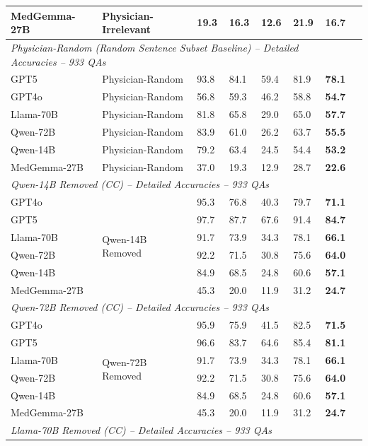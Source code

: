 \documentclass[11pt]{article}
\begin{document}
\begin{longtable}{llllllll}
MedGemma-27B & Physician-Irrelevant & 19.3 & 16.3 & 12.6 & 21.9 & \textbf{16.7} \\
\midrule
\multicolumn{7}{l}{\textit{Physician-Random (Random Sentence Subset Baseline) -- Detailed Accuracies -- 933 QAs}} \\
\midrule
GPT5 & Physician-Random & 93.8 & 84.1 & 59.4 & 81.9 & \textbf{78.1} \\
GPT4o & Physician-Random & 56.8 & 59.3 & 46.2 & 58.8 & \textbf{54.7} \\
Llama-70B & Physician-Random & 81.8 & 65.8 & 29.0 & 65.0 & \textbf{57.7} \\
Qwen-72B & Physician-Random & 83.9 & 61.0 & 26.2 & 63.7 & \textbf{55.5} \\
Qwen-14B & Physician-Random & 79.2 & 63.4 & 24.5 & 54.4 & \textbf{53.2} \\
MedGemma-27B & Physician-Random & 37.0 & 19.3 & 12.9 & 28.7 & \textbf{22.6} \\
\midrule
\multicolumn{7}{l}{\textit{Qwen-14B Removed (CC) -- Detailed Accuracies -- 933 QAs}} \\
\midrule
GPT4o & \multirow{6}{*}{Qwen-14B Removed} & 95.3 & 76.8 & 40.3 & 79.7 & \textbf{71.1} \\
GPT5 &  & 97.7 & 87.7 & 67.6 & 91.4 & \textbf{84.7} \\
Llama-70B &  & 91.7 & 73.9 & 34.3 & 78.1 & \textbf{66.1} \\
Qwen-72B &  & 92.2 & 71.5 & 30.8 & 75.6 & \textbf{64.0} \\
Qwen-14B &  & 84.9 & 68.5 & 24.8 & 60.6 & \textbf{57.1} \\
MedGemma-27B &  & 45.3 & 20.0 & 11.9 & 31.2 & \textbf{24.7} \\
\midrule
\multicolumn{7}{l}{\textit{Qwen-72B Removed (CC) -- Detailed Accuracies -- 933 QAs}} \\
\midrule
GPT4o & \multirow{6}{*}{Qwen-72B Removed} & 95.9 & 75.9 & 41.5 & 82.5 & \textbf{71.5} \\
GPT5 &  & 96.6 & 83.7 & 64.6 & 85.4 & \textbf{81.1} \\
Llama-70B &  & 91.7 & 73.9 & 34.3 & 78.1 & \textbf{66.1} \\
Qwen-72B &  & 92.2 & 71.5 & 30.8 & 75.6 & \textbf{64.0} \\
Qwen-14B &  & 84.9 & 68.5 & 24.8 & 60.6 & \textbf{57.1} \\
MedGemma-27B &  & 45.3 & 20.0 & 11.9 & 31.2 & \textbf{24.7} \\
\midrule
\multicolumn{7}{l}{\textit{Llama-70B Removed (CC) -- Detailed Accuracies -- 933 QAs}} \\

\end{longtable}
\end{document}
